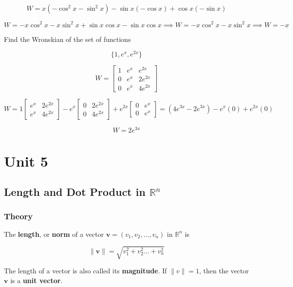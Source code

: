 \documentclass{report}
\begin{document}
$$
W = x \left( -\cos^2{x} - \sin^2{x} \right) - \sin{x} \left( -\cos{x} \right) + \cos{x} \left( -\sin{x} \right)
$$

$$
W = -x \cos^2{x} - x \sin^2{x} + \sin{x} \cos{x} - \sin{x} \cos{x} \implies W = -x \cos^2{x} - x \sin^2{x} \implies \boxed{W=-x}
$$

\begin{tcolorbox}[colframe = lightred]
		Find the Wronskian of the set of functions
		
		$$
		\{1, e^x, e^{2x} \}
		$$
\end{tcolorbox}

$$
W = \begin{bmatrix} 1 & e^x & e^{2x} \\ 0 & e^x & 2e^{2x} \\ 0 & e^x & 4e^{2x} \end{bmatrix}
$$

$$
W = 1 \begin{bmatrix} e^x & 2e^{2x} \\ e^x & 4e^{2x} \end{bmatrix} - e^x \begin{bmatrix} 0 & 2e^{2x} \\ 0 & 4e^{2x} \end{bmatrix} + e^{2x} \begin{bmatrix} 0 & e^x \\ 0 & e^x \end{bmatrix} = \left( 4e^{3x} - 2e^{3x} \right)  - e^x (0) + e^{2x} (0) 
$$

$$	
\boxed{W = 2e^{3x}}
$$


\chapter{Unit 5}

\section{Length and Dot Product in $\mathbb{R}^n$}

\subsection{Theory}

\begin{tcolorbox}[title = Definition of the Length of a Vector in $\mathbb{R}^n$]
	The \textbf{length}, or \textbf{norm} of a vector $\bm{v} = (v_1,v_2,\hdots,v_n)$ in $\mathbb{R}^n$ is 
	
	$$
	\| \bm{v} \| = \sqrt{v_1^2 + v_2^2 \hdots + v_n^2}
	$$
	
	The length of a vector is also called its \textbf{magnitude}. If $\| v \|  = 1$, then the vector $\bm{v}$ is a \textbf{unit vector}.
\end{tcolorbox}
\end{document}
